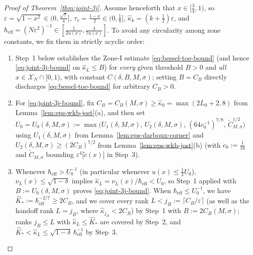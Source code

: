 \documentclass[11pt]{article}
\theoremstyle{definition}
\theoremstyle{remark}
\newcommand{\cX}{\mathcal{X}}
\newcommand{\heff}{\hbar_{\mathrm{eff}}}
\renewcommand{\_}{\oldunderscore\penalty0\hskip0pt\relax}
\begin{document}
\begin{proof}[Proof of Theorem~\ref{thm:joint-3j}]
Assume henceforth that $x\in[\frac34,1)$, so $\varepsilon=\sqrt{1-x^2}\in(0,\frac{\sqrt{7}}{4}]$,
  $\tau_v=\frac{1-x}{2}\in(0,\frac18]$, $\hat{\kappa}_k=(k+\frac12)\varepsilon$, and
  $\heff=(N\varepsilon^2)^{-1}\in[\frac{1}{2u(x)},\frac{4}{7u(x)}]$. To avoid any circularity among zone constants, we fix them
  in strictly acyclic order:
\begin{enumerate}[label=(\arabic*),leftmargin=2em,itemsep=1pt]
\item Step~1 below establishes the Zone-I estimate \eqref{eq:bessel-toe-bound} (and hence \eqref{eq:joint-3j-bound} on
  $\hat{\kappa}_L\le B$) for \emph{every} given threshold $B>0$ and \emph{all} $x\in\cX_N\cap[0,1)$, with constant
  $C(\delta,B,M,\sigma)$; setting $B=C_B$ directly discharges \eqref{eq:bessel-toe-bound} for arbitrary $C_B>0$.
\item For \eqref{eq:joint-3j-bound}, fix $C_B=C_B(M,\sigma)\ge\hat{\kappa}_0=\max(2L_0+2,8)$ from
  Lemma~\ref{lem:eps-wkb-jost}(a), and then set
  $U_0=U_0(\delta,M,\sigma):=\max\bigl(U_1(\delta,M,\sigma),\,U_2(\delta,M,\sigma),\,(64c_0^{-1})^{7/8},\,\widetilde{C}_{M,\sigma}^{1/2}\bigr)$
  using $U_1(\delta,M,\sigma)$ from Lemma~\ref{lem:eps-darboux-corner} and $U_2(\delta,M,\sigma)\ge(2C_B)^{7/2}$ from
  Lemma~\ref{lem:eps-wkb-jost}(b) (with $c_0:=\frac{1}{16}$ and $\widetilde{C}_{M,\sigma}$ bounding
  $\varepsilon^4|\widetilde{c}(x)|$ in Step~3).
\item Whenever $\heff>U_0^{-1}$ (in particular whenever $u(x)\le\frac12 U_0$), $\nu_L(x)\le\sqrt{1-\delta}$ implies
  $\hat{\kappa}_L=\nu_L(x)/\heff<U_0$, so Step~1 applied with $B:=U_0(\delta,M,\sigma)$ proves \eqref{eq:joint-3j-bound}. When
  $\heff\le U_0^{-1}$, we have $\hat{K}_*:=\heff^{-2/7}\ge 2C_B$, and we cover every rank $L<j_B:=\lceil C_B/\varepsilon\rceil$
  (as well as the handoff rank $L=j_B$, where $\hat{\kappa}_{j_B}<2C_B$) by Step~1 with $B:=2C_B(M,\sigma)$; ranks $j_B\le L$
  with $\hat{\kappa}_L\le\hat{K}_*$ are covered by Step~2, and $\hat{K}_*<\hat{\kappa}_L\le\sqrt{1-\delta}\,\heff^{-1}$ by
  Step~3.
\end{enumerate}


\end{proof}
\end{document}
